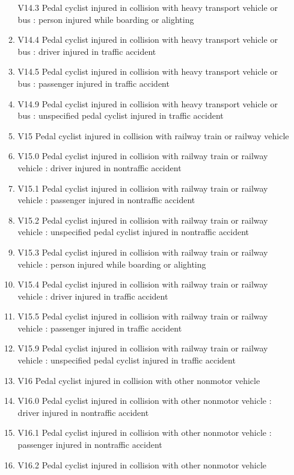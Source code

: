 \documentclass[
]{scrartcl}
\begin{document}
\begin{itemize}
\begin{enumerate}
    V14.3 Pedal cyclist injured in collision with heavy transport
    vehicle or bus : person injured while boarding or alighting
  \item
    V14.4 Pedal cyclist injured in collision with heavy transport
    vehicle or bus : driver injured in traffic accident
  \item
    V14.5 Pedal cyclist injured in collision with heavy transport
    vehicle or bus : passenger injured in traffic accident
  \item
    V14.9 Pedal cyclist injured in collision with heavy transport
    vehicle or bus : unspecified pedal cyclist injured in traffic
    accident
  \item
    V15 Pedal cyclist injured in collision with railway train or railway
    vehicle
  \item
    V15.0 Pedal cyclist injured in collision with railway train or
    railway vehicle : driver injured in nontraffic accident
  \item
    V15.1 Pedal cyclist injured in collision with railway train or
    railway vehicle : passenger injured in nontraffic accident
  \item
    V15.2 Pedal cyclist injured in collision with railway train or
    railway vehicle : unspecified pedal cyclist injured in nontraffic
    accident
  \item
    V15.3 Pedal cyclist injured in collision with railway train or
    railway vehicle : person injured while boarding or alighting
  \item
    V15.4 Pedal cyclist injured in collision with railway train or
    railway vehicle : driver injured in traffic accident
  \item
    V15.5 Pedal cyclist injured in collision with railway train or
    railway vehicle : passenger injured in traffic accident
  \item
    V15.9 Pedal cyclist injured in collision with railway train or
    railway vehicle : unspecified pedal cyclist injured in traffic
    accident
  \item
    V16 Pedal cyclist injured in collision with other nonmotor vehicle
  \item
    V16.0 Pedal cyclist injured in collision with other nonmotor vehicle
    : driver injured in nontraffic accident
  \item
    V16.1 Pedal cyclist injured in collision with other nonmotor vehicle
    : passenger injured in nontraffic accident
  \item
    V16.2 Pedal cyclist injured in collision with other nonmotor vehicle

\end{enumerate}
\end{itemize}
\end{document}
